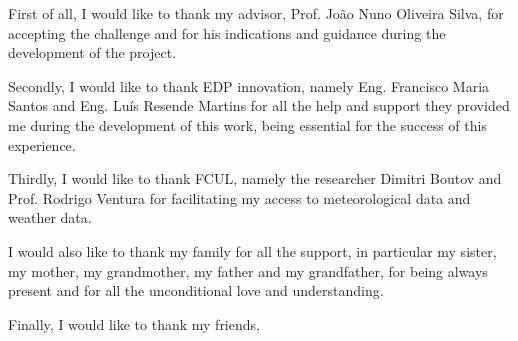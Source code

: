 
First of all, I would like to thank my advisor, Prof. João Nuno Oliveira Silva, for accepting the challenge and for his indications and guidance during the development of the project. 

Secondly, I would like to thank EDP innovation, namely Eng. Francisco Maria Santos and Eng. Luís Resende Martins for all the help and support they provided me during the development of this work, being essential for the success of this experience.

Thirdly, I would like to thank FCUL, namely the researcher Dimitri Boutov and Prof. Rodrigo Ventura for facilitating my access to meteorological data and weather data.

I would also like to thank my family for all the support, in particular my sister, my mother, my grandmother, my father and my grandfather, for being always present and for all the unconditional love and understanding.

Finally, I would like to thank my friends, 